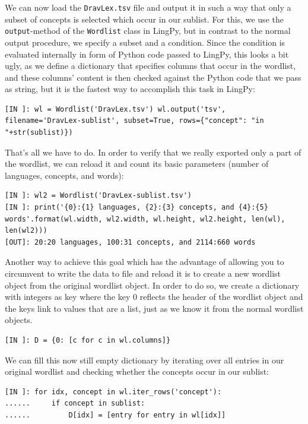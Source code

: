 \documentclass[
  english,
  a4paper,
  oneside,tablecaptionabove
]{scrbook}
\newcommand{\passthrough}[1]{#1}
\begin{document}
We can now load the \passthrough{\lstinline!DravLex.tsv!} file and
output it in such a way that only a subset of concepts is selected which
occur in our sublist. For this, we use the
\passthrough{\lstinline!output!}-method of the
\passthrough{\lstinline!Wordlist!} class in LingPy, but in contrast to
the normal output procedure, we specify a subset and a condition. Since
the condition is evaluated internally in form of Python code passed to
LingPy, this looks a bit ugly, as we define a dictionary that specifies
columns that occur in the wordlist, and these columns' content is then
checked against the Python code that we pass as string, but it is the
fastest way to accomplish this task in LingPy:

\begin{lstlisting}
[IN ]: wl = Wordlist('DravLex.tsv') wl.output('tsv', filename='DravLex-sublist', subset=True, rows={"concept": "in "+str(sublist)})
\end{lstlisting}

That's all we have to do. In order to verify that we really exported
only a part of the wordlist, we can reload it and count its basic
parameters (number of languages, concepts, and words):

\begin{lstlisting}
[IN ]: wl2 = Wordlist('DravLex-sublist.tsv') 
[IN ]: print('{0}:{1} languages, {2}:{3} concepts, and {4}:{5} words'.format(wl.width, wl2.width, wl.height, wl2.height, len(wl), len(wl2))) 
[OUT]: 20:20 languages, 100:31 concepts, and 2114:660 words
\end{lstlisting}

Another way to achieve this goal which has the advantage of allowing you
to circumvent to write the data to file and reload it is to create a new
wordlist object from the original wordlist object. In order to do so, we
create a dictionary with integers as key where the key 0 reflects the
header of the wordlist object and the keys link to values that are a
list, just as we know it from the normal wordlist objects.

\begin{lstlisting}
[IN ]: D = {0: [c for c in wl.columns]}
\end{lstlisting}

We can fill this now still empty dictionary by iterating over all
entries in our original wordlist and checking whether the concepts occur
in our sublist:

\begin{lstlisting}
[IN ]: for idx, concept in wl.iter_rows('concept'):
......     if concept in sublist:
......         D[idx] = [entry for entry in wl[idx]] 
\end{lstlisting}
\end{document}
